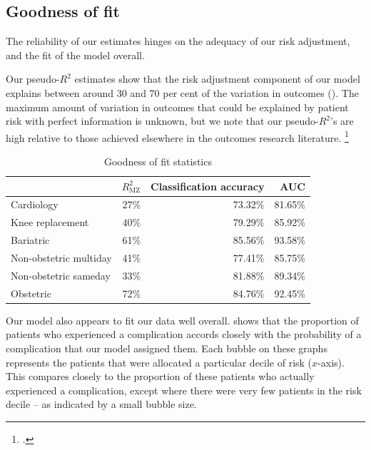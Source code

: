 \documentclass[submission]{grattan}
\begin{document}
\subsection{Goodness of fit}\label{subsec:goodness-of-fit}

The reliability of our estimates hinges on the adequacy of our risk adjustment, and the fit of the model overall.

Our \citeauthor{McKelvey_1975} pseudo-\(R^2\) estimates show that the risk adjustment component of our model explains between around 30 and 70 per cent of the variation in outcomes ().
The maximum amount of variation in outcomes that could be explained by patient risk with perfect information is unknown, but we note that our pseudo-\(R^2\)'s are high relative to those achieved elsewhere in the outcomes research literature.%
	\footcite{zhang2013patient}

\begin{table}
\caption{Goodness of fit statistics}\label{tbl:17-goodness-of-fit-statistics}
\begin{tabularx}{\linewidth}{lRRR}
\toprule
                       & \(R_{\text{MZ}}^{2}\) & \textbf{Classification accuracy} & \textbf{AUC}\tabularnewline
\midrule
Cardiology             & 27\%                  & 73.32\%                 & 81.65\%\tabularnewline
Knee replacement       & 40\%                  & 79.29\%                 & 85.92\%\tabularnewline
Bariatric              & 61\%                  & 85.56\%                 & 93.58\%\tabularnewline
Non-obstetric multiday & 41\%                  & 77.41\%                 & 85.75\%\tabularnewline
Non-obstetric sameday  & 33\%                  & 81.88\%                 & 89.34\%\tabularnewline
Obstetric              & 72\%                  & 84.76\%                 & 92.45\%\tabularnewline
\bottomrule
\end{tabularx}
\end{table}

Our model also appears to fit our data well overall.
 shows that the proportion of patients who experienced a complication accords closely with the probability of a complication that our model assigned them.
Each bubble on these graphs represents the patients that were allocated a particular decile of risk (\(x\)-axis).
This compares closely to the proportion of these patients who actually experienced a complication, except where there were very few patients in the risk decile -- as indicated by a small bubble size.
\end{document}
